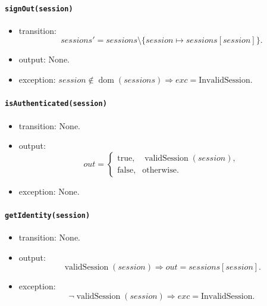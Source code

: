 \documentclass[12pt, titlepage]{article}
\begin{document}
\paragraph{\texttt{signOut(session)}}
\begin{itemize}
    \item transition:
    \[
    \mathit{sessions}'=
        \mathit{sessions}\setminus\{session\mapsto\mathit{sessions}[session]\}.
    \]
    \item output: None.
    \item exception:
    $session\notin\operatorname{dom}(\mathit{sessions})\Rightarrow exc=\text{InvalidSession}$.
\end{itemize}

\paragraph{\texttt{isAuthenticated(session)}}
\begin{itemize}
    \item transition: None.
    \item output:
    \[
    out=
    \begin{cases}
        \text{true}, & \operatorname{validSession}(session),\\
        \text{false}, & \text{otherwise}.
    \end{cases}
    \]
    \item exception: None.
\end{itemize}

\paragraph{\texttt{getIdentity(session)}}
\begin{itemize}
    \item transition: None.
    \item output:
    \[
    \operatorname{validSession}(session)
    \Rightarrow out=\mathit{sessions}[session].
    \]
    \item exception:
    \[
    \neg\operatorname{validSession}(session)
    \Rightarrow exc=\text{InvalidSession}.
    \]
\end{itemize}
\end{document}
